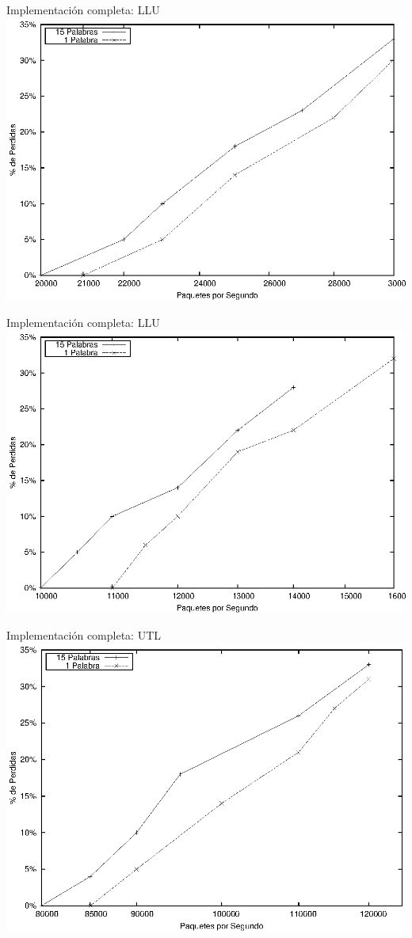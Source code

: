 \documentclass[xcolor=dvipsnames]{beamer}
\begin{document}
\begin{frame}{Implementación completa: LLU} 
\center	
\includegraphics[scale=0.70]{figures/lluprom.eps} 
\end{frame}


\begin{frame}{Implementación completa: LLU} 
\center	
\includegraphics[scale=0.70]{figures/llumax.eps} 
\end{frame}


\begin{frame}{Implementación completa: UTL} 
\center	
\includegraphics[scale=0.70]{figures/utlmin.eps} 
\end{frame}
\end{document}
